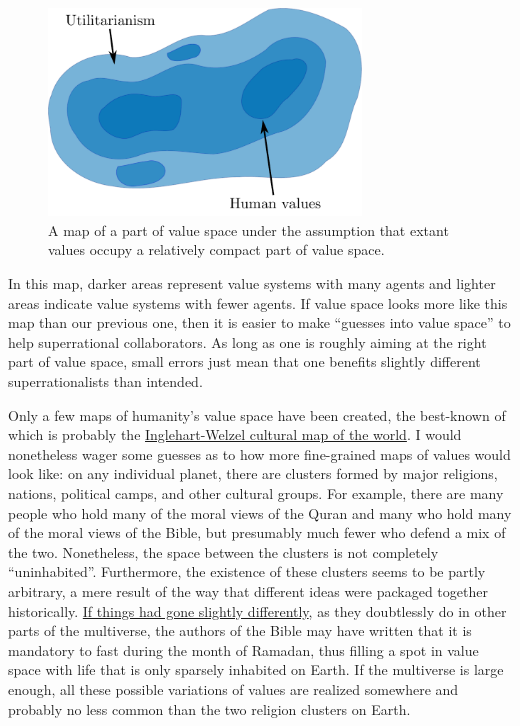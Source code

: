 \begin{figure}
    \centering
    \includegraphics[width=3.26772in]{figs/map-of-value-space-compact}
    \caption{A map of a part of value space under the assumption that extant values occupy a
    relatively compact part of value space.}
    \label{map-of-value-space-compact}
\end{figure}

In this map, darker areas represent value systems with many agents and
lighter areas indicate value systems with fewer agents. If value space
looks more like this map than our previous one, then it is easier to
make ``guesses into value space'' to help superrational collaborators.
As long as one is roughly aiming at the right part of value space, small
errors just mean that one benefits slightly different superrationalists
than intended.

Only a few maps of humanity's value space have been created, the
best-known of which is probably the
\href{https://en.wikipedia.org/wiki/Inglehart\%E2\%80\%93Welzel_cultural_map_of_the_world}{Inglehart-Welzel
cultural map of the world}. I would nonetheless wager some guesses as
to how more fine-grained maps of values would look like: on any
individual planet, there are clusters formed by major religions,
nations, political camps, and other cultural groups. For example, there
are many people who hold many of the moral views of the Quran and many
who hold many of the moral views of the Bible, but presumably much fewer
who defend a mix of the two. Nonetheless, the space between the clusters
is not completely ``uninhabited''. Furthermore, the existence of these
clusters seems to be partly arbitrary, a mere result of the way that
different ideas were packaged together historically.
\href{https://en.wikipedia.org/wiki/Path_dependence}{If things had
gone slightly differently}, as they doubtlessly do in other parts of
the multiverse, the authors of the Bible may have written that it is
mandatory to fast during the month of Ramadan, thus filling a spot in
value space with life that is only sparsely inhabited on Earth. If the
multiverse is large enough, all these possible variations of values are
realized somewhere and probably no less common than the two religion
clusters on Earth.

